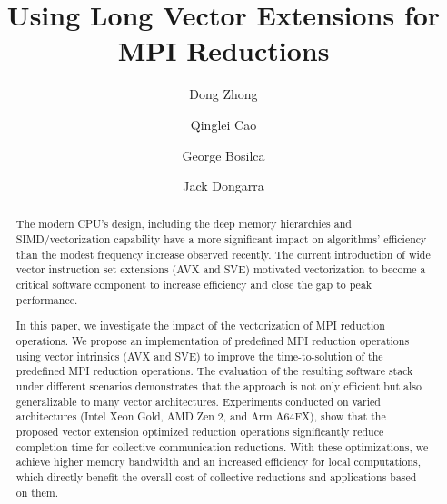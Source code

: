 \documentclass[5p,times,twocolumn]{elsarticle}
\begin{document}
\title{Using Long Vector Extensions for MPI Reductions}

\author[First]{Dong Zhong}

\author[First]{Qinglei Cao}

\author[First]{George Bosilca}

\author[First]{Jack Dongarra}

\address[First]{The University of Tennessee, 1122 Volunteer Blvd, Knoxville, TN 37996}

\begin{abstract}
  The modern CPU's design, including the deep memory hierarchies and
  SIMD/vectorization capability have a more significant impact on algorithms' efficiency than
  the modest frequency increase observed recently. The current
  introduction of wide vector instruction set extensions (AVX and SVE) motivated
  vectorization to become a critical software component to increase efficiency and
  close the gap to peak performance.

  In this paper, we investigate the impact of the vectorization of MPI reduction
  operations. We propose an implementation of predefined MPI reduction
  operations using vector intrinsics (AVX and SVE) to improve the
  time-to-solution of the predefined MPI reduction operations.
  The evaluation of the resulting software stack under different scenarios
  demonstrates that the approach is not only efficient but also generalizable to many vector architectures.  Experiments
  conducted on varied architectures (Intel Xeon Gold, AMD Zen 2, and Arm
  A64FX), show that the proposed vector extension optimized reduction operations
  significantly reduce completion time for collective communication reductions.
  With these optimizations, we achieve higher memory bandwidth and an increased
  efficiency for local computations, which directly benefit the overall cost of
  collective reductions and applications based on them.


\end{abstract}
\end{document}
